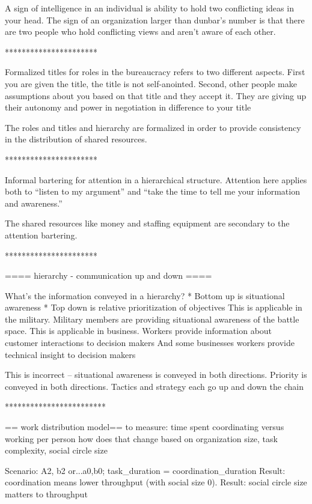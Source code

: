 A sign of intelligence in an individual is ability to hold two conflicting ideas in your head. The sign of an organization larger than dunbar's number is that there are two people who hold conflicting views and aren't aware of each other.

**********************



Formalized titles for roles in the bureaucracy refers to two different aspects.
First you are given the title, the title is not self-anointed.
Second, other people make assumptions about you based on that title and they accept it. They are giving up their autonomy and power in negotiation in difference to your title


The roles and titles and hierarchy are formalized in order to provide consistency in the distribution of shared resources.

**********************

Informal bartering for attention in a hierarchical structure. Attention here applies both to ``listen to my argument'' and ``take the time to tell me your information and awareness.''

The shared resources like money and staffing equipment are secondary to the attention bartering.

**********************


==== hierarchy - communication up and down ====

What's the information conveyed in a hierarchy?
* Bottom up is situational awareness
* Top down is relative prioritization of objectives
This is applicable in the military. Military members are providing situational awareness of the battle space.
This is applicable in business. Workers provide information about customer interactions to decision makers
And some businesses workers provide technical insight to decision makers

This is incorrect -- situational awareness is conveyed in both directions. Priority is conveyed in both directions. Tactics and strategy each go up and down the chain

************************

== work distribution model==
to measure: time spent coordinating versus working per person
how does that change based on organization size, task complexity, social circle size

Scenario: A2, b2 or...a0,b0; task_duration = coordination_duration
Result: coordination means lower throughput (with social size 0).
Result: social circle size matters to throughput


